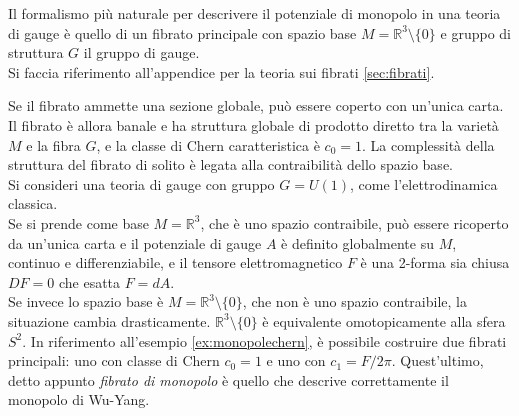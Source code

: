 Il formalismo più naturale per descrivere il potenziale di monopolo in una teoria
di gauge è quello di un fibrato principale con spazio base $M = \mathbb{R}^3
\setminus \{0\}$ e gruppo di struttura $G$ il gruppo di gauge.\\
Si faccia riferimento all'appendice per la teoria sui fibrati \ref{sec:fibrati}.

Se il fibrato ammette una sezione globale, può essere coperto con un'unica carta.
Il fibrato è allora banale e ha struttura globale di prodotto diretto tra la
varietà $M$ e la fibra $G$, e la classe di Chern caratteristica è $c_0 = 1$.
La complessità della struttura del fibrato di solito è legata alla contraibilità
dello spazio base.\\

Si consideri una teoria di gauge con gruppo $G = U(1)$, come l'elettrodinamica classica.\\

Se si prende come base $M = \mathbb{R}^3$, che è uno spazio contraibile, può essere
ricoperto da un'unica carta e il potenziale di gauge $A$ è definito globalmente su $M$,
continuo e differenziabile, e il tensore elettromagnetico $F$ è una 2-forma
sia chiusa $DF = 0$ che esatta $F = dA$.\\

Se invece lo spazio base è $M = \mathbb{R}^3 \setminus \{0\}$, che non è uno spazio
contraibile, la situazione cambia drasticamente. $\mathbb{R}^3 \setminus \{0\}$ è
equivalente omotopicamente alla sfera $S^2$.
In riferimento all'esempio \ref{ex:monopolechern}, è possibile costruire due fibrati
principali: uno con classe di Chern $c_0 = 1$ e uno con $c_1 = F/2\pi$. Quest'ultimo,
detto appunto \emph{fibrato di monopolo} è quello che descrive correttamente il
monopolo di Wu-Yang.
